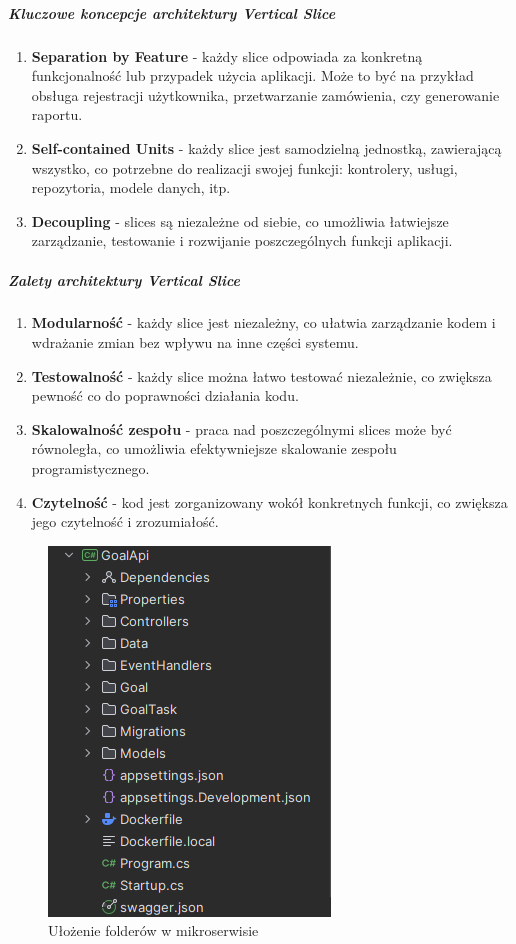 \subparagraph{Kluczowe koncepcje architektury Vertical Slice}

\begin{enumerate}
\item {\bf Separation by Feature} - każdy slice odpowiada za konkretną funkcjonalność lub przypadek użycia aplikacji. Może to być na przykład obsługa rejestracji użytkownika, przetwarzanie zamówienia, czy generowanie raportu.
\item {\bf Self-contained Units} - każdy slice jest samodzielną jednostką, zawierającą wszystko, co potrzebne do realizacji swojej funkcji: kontrolery, usługi, repozytoria, modele danych, itp.
\item {\bf Decoupling} - slices są niezależne od siebie, co umożliwia łatwiejsze zarządzanie, testowanie i rozwijanie poszczególnych funkcji aplikacji.
\end{enumerate}

\subparagraph{Zalety architektury Vertical Slice}

\begin{enumerate}
\item {\bf Modularność} - każdy slice jest niezależny, co ułatwia zarządzanie kodem i wdrażanie zmian bez wpływu na inne części systemu.
\item {\bf Testowalność} - każdy slice można łatwo testować niezależnie, co zwiększa pewność co do poprawności działania kodu.
\item {\bf Skalowalność zespołu} - praca nad poszczególnymi slices może być równoległa, co umożliwia efektywniejsze skalowanie zespołu programistycznego.
\item {\bf Czytelność} - kod jest zorganizowany wokół konkretnych funkcji, co zwiększa jego czytelność i zrozumiałość.
\end{enumerate}

\begin{figure}[H]
    \centering
    \includegraphics[width=0.5\linewidth]{Obrazy/goalFolderBE.png}
    \caption{Ułożenie folderów w mikroserwisie}
    \label{fig:enter-label}
\end{figure}

